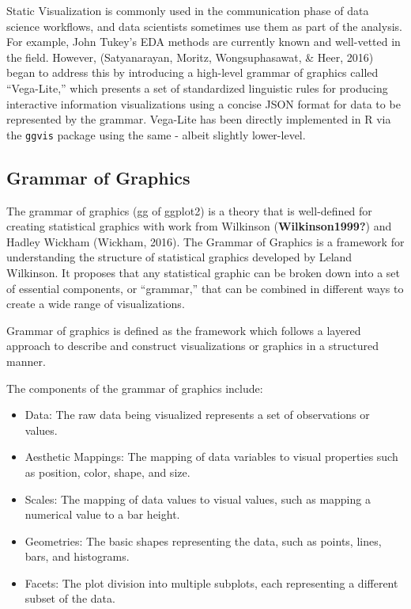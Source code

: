 \documentclass[print]{nuthesis}
\providecommand{\tightlist}{%
  \setlength{\itemsep}{0pt}\setlength{\parskip}{0pt}}
\begin{document}
Static Visualization is commonly used in the communication phase of data science workflows, and data scientists sometimes use them as part of the analysis. For example, John Tukey's EDA methods are currently known and well-vetted in the field. However, (Satyanarayan, Moritz, Wongsuphasawat, \& Heer, 2016) began to address this by introducing a high-level grammar of graphics called ``Vega-Lite,'' which presents a set of standardized linguistic rules for producing interactive information visualizations using a concise JSON format for data to be represented by the grammar. Vega-Lite has been directly implemented in R via the \texttt{ggvis} package using the same - albeit slightly lower-level.

\hypertarget{grammar-of-graphics}{%
\subsection{Grammar of Graphics}\label{grammar-of-graphics}}

The grammar of graphics (gg of ggplot2) is a theory that is well-defined for creating statistical graphics with work from Wilkinson (\textbf{Wilkinson1999?}) and Hadley Wickham (Wickham, 2016). The Grammar of Graphics is a framework for understanding the structure of statistical graphics developed by Leland Wilkinson. It proposes that any statistical graphic can be broken down into a set of essential components, or ``grammar,'' that can be combined in different ways to create a wide range of visualizations.

Grammar of graphics is defined as the framework which follows a layered approach to describe and construct visualizations or graphics in a structured manner.

The components of the grammar of graphics include:

\begin{itemize}
\tightlist
\item
  Data: The raw data being visualized represents a set of observations or values.
\item
  Aesthetic Mappings: The mapping of data variables to visual properties such as position, color, shape, and size.
\item
  Scales: The mapping of data values to visual values, such as mapping a numerical value to a bar height.
\item
  Geometries: The basic shapes representing the data, such as points, lines, bars, and histograms.
\item
  Facets: The plot division into multiple subplots, each representing a different subset of the data.
\end{itemize}
\end{document}
